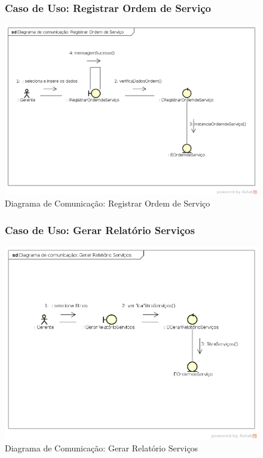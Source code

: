 \documentclass[
	12pt,				%
	openright,
	oneside,			%
	a4paper,			%
	chapter=TITLE,		%
	brazil				%
	]{abntex2}
\begin{document}
\begin{figure}[h!]

\subsubsection*{Caso de Uso: Registrar Ordem de Serviço}


	\caption{Diagrama de Comunicação: Registrar Ordem de Serviço}
	\begin{center}
	    \includegraphics[scale=0.5]{Arquivos/Projeto/C_registrar_ordem_servico}  
	\end{center}
\end{figure}




\begin{figure}[h!]

\subsubsection*{Caso de Uso: Gerar Relatório Serviços}


	\caption{Diagrama de Comunicação: Gerar Relatório Serviços}
	\begin{center}
	    \includegraphics[scale=0.5]{Arquivos/Projeto/C_relatorio_servicos}  
	\end{center}
\end{figure}
\end{document}
